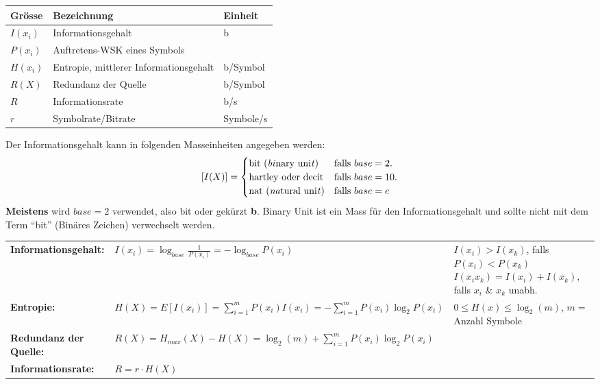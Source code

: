 \begin{multicols}{2}
\renewcommand{\arraystretch}{\arraystretchOriginal}
\begin{tabular}{|l|l|l|}
	\hline
	\textbf{Grösse}	& \textbf{Bezeichnung}	& \textbf{Einheit} \\ 
	\hline
	$I(x_i)$ 	& Informationsgehalt 	& b \\
	\hline
	$P(x_i)$	& Auftretens-WSK eines Symbols & \\
	\hline
	$H(x_i)$	& Entropie, mittlerer Informationsgehalt				& b/Symbol\\
	\hline
	$R(X)$		& Redundanz der Quelle			& b/Symbol \\
	\hline
	$R$			& Informationsrate 		& b/s \\
	\hline
	$r$			& Symbolrate/Bitrate	& Symbole/s	 \\
	\hline
\end{tabular}

Der Informationsgehalt kann in folgenden Masseinheiten angegeben werden:
\[ [I(X)] = \begin{cases}
            	\text{bit (\emph{bi}nary uni\emph{t})} 
            		& \text{falls } base=2. \\
            	\text{hartley oder decit}
            		& \text{falls } base=10. \\
            	\text{nat (\emph{na}tural uni\emph{t})} 
            		& \text{falls } base=e
			\end{cases} 
\]
\textbf{Meistens} wird $base=2$ verwendet, also bit oder gekürzt
\textbf{b}. Binary Unit ist ein Mass für den Informationsgehalt und sollte nicht mit dem Term ``bit'' (Binäres Zeichen) verwechselt
werden.
\end{multicols}
\begin{tabular}{l l l}


  	\textbf{Informationsgehalt:}
  	& $I(x_i) =  \log_{base} \frac{1}{P(x_i)} = - \log_{base} P(x_i)$
  	& \parbox[c]{10cm}{
  		$I(x_i) > I(x_k)$, falls $P(x_i) < 	P(x_k)$ \\
  		$I(x_i x_k) = I(x_i) + I(x_k)$, falls $x_i$ \& $x_k$ unabh.
  	} \\
  
  	\textbf{Entropie:}
  	& $H(X)	= E[I(x_i)] = \sum\limits_{i=1}^m P(x_i) I(x_i) = - \sum\limits_{i=1}^m  P(x_i) \log_2{P(x_i)} $
  	& $ 0 \leq H(x) \leq \log_2(m)$, $m =$ Anzahl Symbole \\

	\textbf{Redundanz der Quelle:} 
	& $R(X) = H_{max}(X) - H(X) = \log_2(m) + \sum\limits_{i=1}^m  P(x_i) \log_2{P(x_i)}$ \\
	
	\textbf{Informationsrate:} 
	& $R = r \cdot H(X)$ \\
	
\end{tabular}

